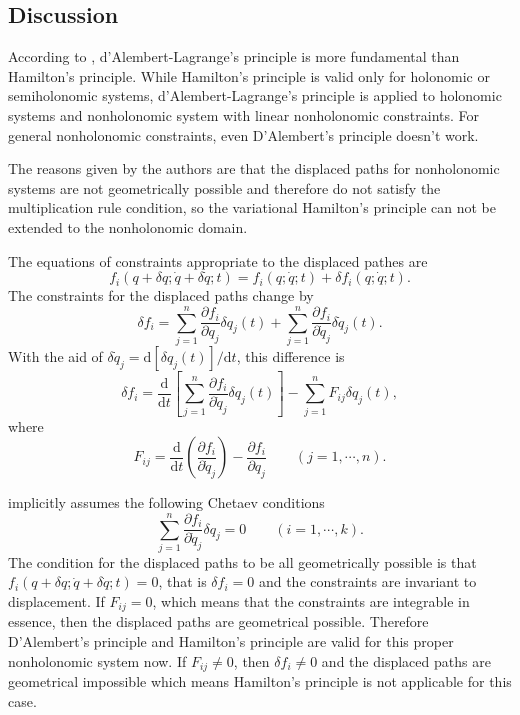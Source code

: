 \documentclass[preprint,11pt]{elsarticle}
\newcommand{\mathd}{\mathrm{d}}
\begin{document}
\subsection{Discussion}
According to \cite{flannery2005} , d'Alembert-Lagrange's principle is more fundamental than
Hamilton's principle. While Hamilton's principle is
valid only for holonomic or semiholonomic systems, d'Alembert-Lagrange's
principle is applied to holonomic systems and nonholonomic system with linear
nonholonomic constraints. For general nonholonomic constraints, even
D'Alembert's principle doesn't work.

The reasons given by the authors are that the displaced paths for nonholonomic
systems are not geometrically possible and therefore do not satisfy the
multiplication rule condition, so the variational Hamilton's principle
can not be extended to the nonholonomic domain.

The equations of constraints appropriate to the displaced pathes are
\begin{equation}
f_i ( q + \delta q ; \dot{q} + \delta \dot{q} ; t) = f_i ( q ; \dot{q} ;
   t) + \delta f_i ( q ; \dot{q} ; t).
\end{equation}
The constraints for the displaced paths change by
\begin{equation}
 \delta f_i = \sum_{j = 1}^n  \frac{\partial f_i}{\partial q_j} \delta q_j (
   t) + \sum_{j = 1}^n \frac{\partial f_i}{\partial
   \dot{q}_j} \delta \dot{q}_j ( t) .
\end{equation}
With the aid of $\delta \dot{q}_j = \mathd [ \delta q_j ( t)] / \mathd t$,
this difference is
\begin{equation}
\delta f_i = \frac{\mathd}{\mathd t} \left[ \sum_{j = 1}^n \frac{\partial
   f_i}{\partial \dot{q}_j} \delta q_j ( t) \right] - \sum_{j = 1}^n F_{i j}
   \delta q_j ( t) , \label{variation}
\end{equation}
where
\[ F_{i j} = \frac{\mathd}{\mathd t} \left( \frac{\partial f_i}{\partial
   \dot{q}_j} \right) - \frac{\partial f_i}{\partial q_j} \hspace{2em} ( j =
   1, \cdots, n) . \]


\cite{flannery2005} implicitly assumes the following Chetaev conditions
\[ \sum_{j = 1}^n \frac{\partial f_i}{\partial \dot{q}_j} \delta q_j = 0
   \hspace{2em} ( i = 1, \cdots, k) . \]
The condition for the displaced paths to be all geometrically possible is that
$f_i ( q + \delta q ; \dot{q} + \delta \dot{q} ; t) = 0$, that is $\delta f_i
= 0$ and the constraints are invariant to displacement. If $F_{i j} = 0$,
which means that the constraints are integrable in essence, then the displaced paths are geometrical possible.
Therefore D'Alembert's principle and Hamilton's principle are valid for this proper nonholonomic system now.
If $F_{i j} \neq 0$, then $\delta f_i \neq 0$ and the displaced paths are geometrical impossible which means Hamilton's principle is not applicable for this case.
\end{document}
